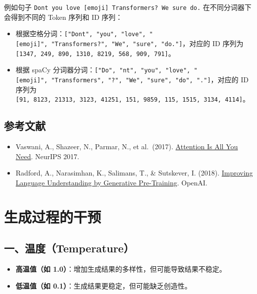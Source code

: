 例如句子 \texttt{Don\textquotesingle{}t\ you\ love\ {[}emoji{]}\ Transformers?\ We\ sure\ do.} 在不同分词器下会得到不同的 Token 序列和 ID 序列：

\begin{itemize}
\tightlist
\item
  根据空格分词：\texttt{{[}"Don\textquotesingle{}t",\ "you",\ "love",\ "{[}emoji{]}",\ "Transformers?",\ "We",\ "sure",\ "do."{]}}，对应的 ID 序列为 \texttt{{[}1347,\ 249,\ 890,\ 1310,\ 8219,\ 568,\ 909,\ 791{]}}。
\item
  根据 spaCy 分词器分词：\texttt{{[}"Do",\ "n\textquotesingle{}t",\ "you",\ "love",\ "{[}emoji{]}",\ "Transformers",\ "?",\ "We",\ "sure",\ "do",\ "."{]}}，对应的 ID 序列为 \texttt{{[}91,\ 8123,\ 21313,\ 3123,\ 41251,\ 151,\ 9859,\ 115,\ 1515,\ 3134,\ 4114{]}}。
\end{itemize}

\hypertarget{ux53c2ux8003ux6587ux732e-72}{%
\subsection{参考文献}\label{ux53c2ux8003ux6587ux732e-72}}

\begin{itemize}
\tightlist
\item
  Vaswani, A., Shazeer, N., Parmar, N., et al.~(2017). \href{https://arxiv.org/abs/1706.03762}{Attention Is All You Need}. NeurIPS 2017.
\item
  Radford, A., Narasimhan, K., Salimans, T., \& Sutskever, I. (2018). \href{https://cdn.openai.com/research-covers/language-unsupervised/language_understanding_paper.pdf}{Improving Language Understanding by Generative Pre-Training}. OpenAI.
\end{itemize}

\clearpage

\hypertarget{ux751fux6210ux8fc7ux7a0bux7684ux5e72ux9884}{%
\section{生成过程的干预}\label{ux751fux6210ux8fc7ux7a0bux7684ux5e72ux9884}}

\hypertarget{ux4e00ux6e29ux5ea6temperature}{%
\subsection{一、温度（Temperature）}\label{ux4e00ux6e29ux5ea6temperature}}

\begin{itemize}
\tightlist
\item
  \textbf{高温值（如 1.0）}：增加生成结果的多样性，但可能导致结果不稳定。
\item
  \textbf{低温值（如 0.1）}：生成结果更稳定，但可能缺乏创造性。
\end{itemize}

